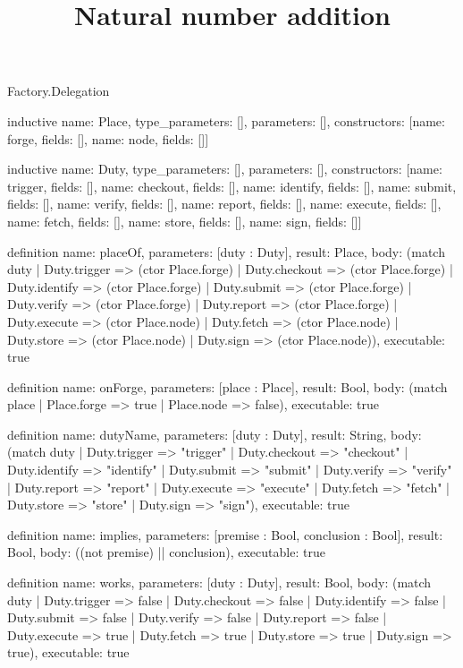 \begin{lexlean}{Factory.Delegation}
\title{Natural number addition}
\begin{semanticmodule}
inductive{
  name: Place,
  type_parameters: [],
  parameters: [],
  constructors: [{name: forge, fields: []}, {name: node, fields: []}]
}

inductive{
  name: Duty,
  type_parameters: [],
  parameters: [],
  constructors: [{name: trigger, fields: []}, {name: checkout, fields: []}, {name: identify, fields: []}, {name: submit, fields: []}, {name: verify, fields: []}, {name: report, fields: []}, {name: execute, fields: []}, {name: fetch, fields: []}, {name: store, fields: []}, {name: sign, fields: []}]
}

definition{
  name: placeOf,
  parameters: [duty : Duty],
  result: Place,
  body: (match duty
    | Duty.trigger => (ctor Place.forge)
    | Duty.checkout => (ctor Place.forge)
    | Duty.identify => (ctor Place.forge)
    | Duty.submit => (ctor Place.forge)
    | Duty.verify => (ctor Place.forge)
    | Duty.report => (ctor Place.forge)
    | Duty.execute => (ctor Place.node)
    | Duty.fetch => (ctor Place.node)
    | Duty.store => (ctor Place.node)
    | Duty.sign => (ctor Place.node)),
  executable: true
}

definition{
  name: onForge,
  parameters: [place : Place],
  result: Bool,
  body: (match place
    | Place.forge => true
    | Place.node => false),
  executable: true
}

definition{
  name: dutyName,
  parameters: [duty : Duty],
  result: String,
  body: (match duty
    | Duty.trigger => "trigger"
    | Duty.checkout => "checkout"
    | Duty.identify => "identify"
    | Duty.submit => "submit"
    | Duty.verify => "verify"
    | Duty.report => "report"
    | Duty.execute => "execute"
    | Duty.fetch => "fetch"
    | Duty.store => "store"
    | Duty.sign => "sign"),
  executable: true
}

definition{
  name: implies,
  parameters: [premise : Bool, conclusion : Bool],
  result: Bool,
  body: ((not premise) || conclusion),
  executable: true
}

definition{
  name: works,
  parameters: [duty : Duty],
  result: Bool,
  body: (match duty
    | Duty.trigger => false
    | Duty.checkout => false
    | Duty.identify => false
    | Duty.submit => false
    | Duty.verify => false
    | Duty.report => false
    | Duty.execute => true
    | Duty.fetch => true
    | Duty.store => true
    | Duty.sign => true),
  executable: true
}


\end{semanticmodule}
\end{lexlean}
